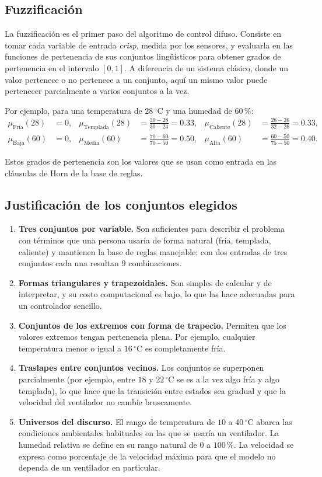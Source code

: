 \documentclass[11pt]{article}
\begin{document}
\subsection{Fuzzificación}

La fuzzificación es el primer paso del algoritmo de control difuso. Consiste en tomar cada variable de entrada \emph{crisp}, medida por los sensores, y evaluarla en las funciones de pertenencia de sus conjuntos lingüísticos para obtener grados de pertenencia en el intervalo $[0, 1]$. A diferencia de un sistema clásico, donde un valor pertenece o no pertenece a un conjunto, aquí un mismo valor puede pertenecer parcialmente a varios conjuntos a la vez.

Por ejemplo, para una temperatura de $28\,^\circ$C y una humedad de $60\,\%$:
\begin{align*}
\mu_{\text{Fría}}(28) &= 0, &
\mu_{\text{Templada}}(28) &= \frac{30 - 28}{30 - 24} = 0.33, &
\mu_{\text{Caliente}}(28) &= \frac{28 - 26}{32 - 26} = 0.33, \\[6pt]
\mu_{\text{Baja}}(60) &= 0, &
\mu_{\text{Media}}(60) &= \frac{70 - 60}{70 - 50} = 0.50, &
\mu_{\text{Alta}}(60) &= \frac{60 - 50}{75 - 50} = 0.40.
\end{align*}

Estos grados de pertenencia son los valores que se usan como entrada en las cláusulas de Horn de la base de reglas.

\subsection{Justificación de los conjuntos elegidos}

\begin{enumerate}
  \item \textbf{Tres conjuntos por variable.} Son suficientes para describir el problema con términos que una persona usaría de forma natural (fría, templada, caliente) y mantienen la base de reglas manejable: con dos entradas de tres conjuntos cada una resultan 9 combinaciones.
  \item \textbf{Formas triangulares y trapezoidales.} Son simples de calcular y de interpretar, y su costo computacional es bajo, lo que las hace adecuadas para un controlador sencillo.
  \item \textbf{Conjuntos de los extremos con forma de trapecio.} Permiten que los valores extremos tengan pertenencia plena. Por ejemplo, cualquier temperatura menor o igual a $16\,^\circ$C es completamente fría.
  \item \textbf{Traslapes entre conjuntos vecinos.} Los conjuntos se superponen parcialmente (por ejemplo, entre $18$ y $22\,^\circ$C se es a la vez algo fría y algo templada), lo que hace que la transición entre estados sea gradual y que la velocidad del ventilador no cambie bruscamente.
  \item \textbf{Universos del discurso.} El rango de temperatura de $10$ a $40\,^\circ$C abarca las condiciones ambientales habituales en las que se usaría un ventilador. La humedad relativa se define en su rango natural de $0$ a $100\,\%$. La velocidad se expresa como porcentaje de la velocidad máxima para que el modelo no dependa de un ventilador en particular.
\end{enumerate}
\end{document}
